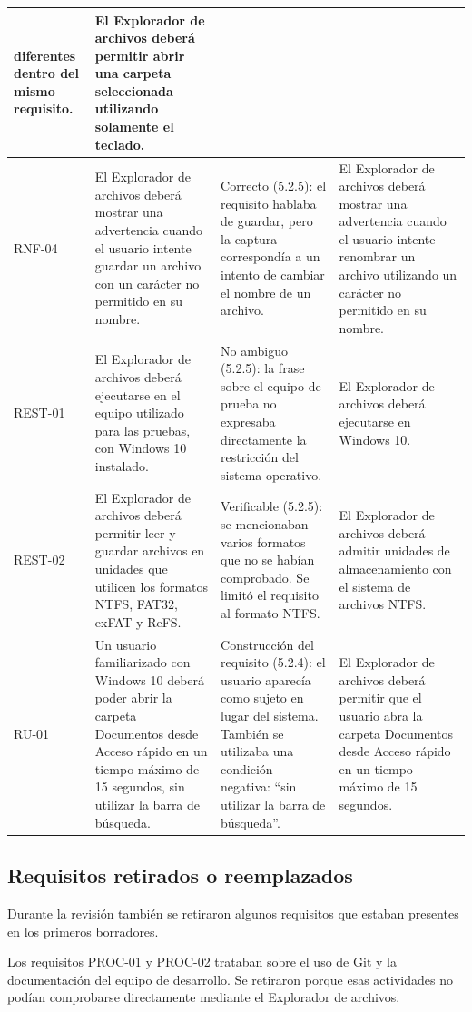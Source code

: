 \documentclass[10pt,a4paper]{article}
\begin{document}
{\begin{longtable}{%
>{\raggedright\arraybackslash}p{1cm}%
>{\raggedright\arraybackslash}p{4.8cm}%
>{\raggedright\arraybackslash}p{3.2cm}%
>{\raggedright\arraybackslash}p{5.3cm}%
}
diferentes dentro del mismo requisito. &
El Explorador de archivos deberá permitir abrir
una carpeta seleccionada utilizando solamente
el teclado. \\
\hline
RNF-04 &
El Explorador de archivos deberá mostrar una
advertencia cuando el usuario intente guardar
un archivo con un carácter no permitido en su nombre. &
Correcto (5.2.5): el requisito hablaba de guardar,
pero la captura correspondía a un intento de
cambiar el nombre de un archivo. &
El Explorador de archivos deberá mostrar una
advertencia cuando el usuario intente renombrar
un archivo utilizando un carácter no permitido
en su nombre. \\
\hline
REST-01 &
El Explorador de archivos deberá ejecutarse
en el equipo utilizado para las pruebas,
con Windows 10 instalado. &
No ambiguo (5.2.5): la frase sobre el equipo
de prueba no expresaba directamente
la restricción del sistema operativo. &
El Explorador de archivos deberá ejecutarse
en Windows 10. \\
\hline
REST-02 &
El Explorador de archivos deberá permitir leer
y guardar archivos en unidades que utilicen
los formatos NTFS, FAT32, exFAT y ReFS. &
Verificable (5.2.5): se mencionaban varios
formatos que no se habían comprobado.
Se limitó el requisito al formato NTFS. &
El Explorador de archivos deberá admitir unidades
de almacenamiento con el sistema de archivos NTFS. \\
\hline
RU-01 &
Un usuario familiarizado con Windows 10 deberá
poder abrir la carpeta Documentos desde Acceso rápido
en un tiempo máximo de 15 segundos, sin utilizar
la barra de búsqueda. &
Construcción del requisito (5.2.4): el usuario
aparecía como sujeto en lugar del sistema.
También se utilizaba una condición negativa:
\enquote{sin utilizar la barra de búsqueda}. &
El Explorador de archivos deberá permitir que el usuario
abra la carpeta Documentos desde Acceso rápido
en un tiempo máximo de 15 segundos. \\
\end{longtable}
}

\subsection*{Requisitos retirados o reemplazados}

Durante la revisión también se retiraron algunos requisitos que estaban presentes en los primeros borradores.

Los requisitos PROC-01 y PROC-02 trataban sobre el uso de Git y la documentación del equipo de desarrollo. Se retiraron porque esas actividades no podían comprobarse directamente mediante el Explorador de archivos.
\end{document}
